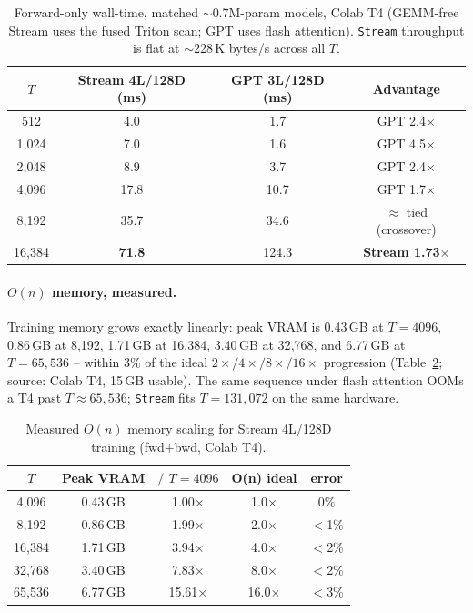 \documentclass[11pt]{article}
\newcommand{\Stream}{\texttt{Stream}}
\begin{document}
\begin{table}[t]
  \centering
  \small
  \begin{tabular}{cccc}
    \toprule
    $T$ & Stream 4L/128D (ms) & GPT 3L/128D (ms) & Advantage \\
    \midrule
    512    & 4.0  & 1.7  & GPT 2.4$\times$ \\
    1{,}024 & 7.0  & 1.6  & GPT 4.5$\times$ \\
    2{,}048 & 8.9  & 3.7  & GPT 2.4$\times$ \\
    4{,}096 & 17.8 & 10.7 & GPT 1.7$\times$ \\
    8{,}192 & 35.7 & 34.6 & $\approx$ tied (crossover) \\
    16{,}384 & \textbf{71.8} & 124.3 & \textbf{Stream 1.73$\times$} \\
    \bottomrule
  \end{tabular}
  \caption{Forward-only wall-time, matched $\sim$0.7M-param models, Colab T4
  (GEMM-free Stream uses the fused Triton scan; GPT uses flash attention).
  \Stream{} throughput is flat at $\sim$228\,K bytes/s across all $T$.}
  \label{tab:gpuwing}
\end{table}

\paragraph{$O(n)$ memory, measured.}
Training memory grows exactly linearly: peak VRAM is 0.43\,GB at $T{=}4096$,
0.86\,GB at 8{,}192, 1.71\,GB at 16{,}384, 3.40\,GB at 32{,}768, and 6.77\,GB at
$T{=}65{,}536$ -- within 3\% of the ideal $2\times/4\times/8\times/16\times$
progression (Table~\ref{tab:mem}; source: Colab T4, 15\,GB usable). The same
sequence under flash attention OOMs a T4 past $T{\approx}65{,}536$; \Stream{}
fits $T{=}131{,}072$ on the same hardware.

\begin{table}[t]
  \centering
  \small
  \begin{tabular}{ccccc}
    \toprule
    $T$ & Peak VRAM & $/$ $T{=}4096$ & O(n) ideal & error \\
    \midrule
    4{,}096   & 0.43\,GB & 1.00$\times$ & 1.0$\times$ & 0\% \\
    8{,}192   & 0.86\,GB & 1.99$\times$ & 2.0$\times$ & $<$1\% \\
    16{,}384  & 1.71\,GB & 3.94$\times$ & 4.0$\times$ & $<$2\% \\
    32{,}768  & 3.40\,GB & 7.83$\times$ & 8.0$\times$ & $<$2\% \\
    65{,}536  & 6.77\,GB & 15.61$\times$ & 16.0$\times$ & $<$3\% \\
    \bottomrule
  \end{tabular}
  \caption{Measured $O(n)$ memory scaling for Stream 4L/128D training
  (fwd$+$bwd, Colab T4).}
  \label{tab:mem}
\end{table}
\end{document}
